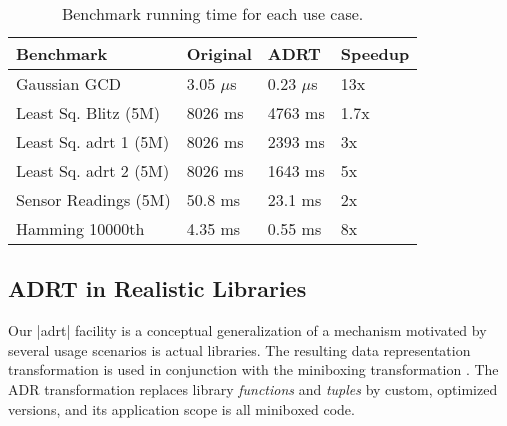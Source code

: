 \begin{table}[t!]
  \centering
  \begin{tabularx}{0.48\textwidth}{|g *{3}{|Y}|} \hline
    \textbf{Benchmark}   &  \textbf{Original}  &     \textbf{ADRT} &      \textbf{Speedup} \\ \hline
    Gaussian GCD         &        3.05 $\mu$s &      0.23 $\mu$s &                   13x \\
    Least Sq. Blitz (5M) &             8026 ms &           4763 ms &                  1.7x \\
    Least Sq. adrt 1 (5M) &             8026 ms &           2393 ms &                    3x \\
    Least Sq. adrt 2 (5M) &             8026 ms &           1643 ms &                    5x \\
    Sensor Readings (5M) &             50.8 ms &           23.1 ms &                    2x \\
    Hamming 10000th      &             4.35 ms &           0.55 ms &                    8x \\ \hline
  \end{tabularx}
  \vspace{-2mm}
  \caption{Benchmark running time for each use case.}
  \label{table:adrt}
  \vspace{-1em }
\end{table}

\subsection{ADRT in Realistic Libraries}
\label{sec:benchmarks:funcs}


Our |adrt| facility is a conceptual generalization of a mechanism
motivated by several usage scenarios is actual libraries. The
resulting data representation transformation is used in conjunction
with the miniboxing transformation \cite{miniboxing-www, miniboxing}.
The ADR transformation replaces library \emph{functions} and
\emph{tuples} by custom, optimized versions, and its application scope
is all miniboxed code.

